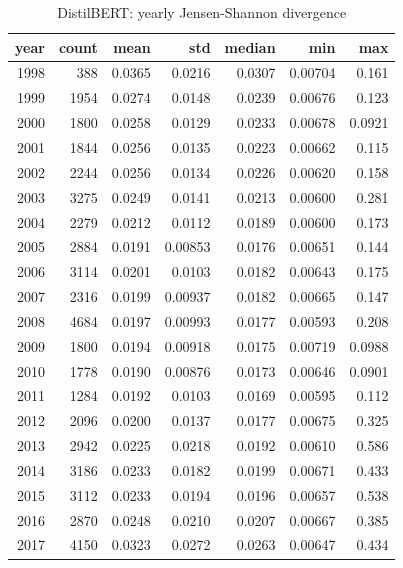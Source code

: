 \begin{table}[ht]
\centering
\caption{DistilBERT: yearly Jensen-Shannon divergence}
\label{tab:distilbert_jsd_all_years}
\begin{tabular}{rrrrrrr}
\toprule
year & count & mean & std & median & min & max \\
\midrule
1998 & 388 & 0.0365 & 0.0216 & 0.0307 & 0.00704 & 0.161 \\
1999 & 1954 & 0.0274 & 0.0148 & 0.0239 & 0.00676 & 0.123 \\
2000 & 1800 & 0.0258 & 0.0129 & 0.0233 & 0.00678 & 0.0921 \\
2001 & 1844 & 0.0256 & 0.0135 & 0.0223 & 0.00662 & 0.115 \\
2002 & 2244 & 0.0256 & 0.0134 & 0.0226 & 0.00620 & 0.158 \\
2003 & 3275 & 0.0249 & 0.0141 & 0.0213 & 0.00600 & 0.281 \\
2004 & 2279 & 0.0212 & 0.0112 & 0.0189 & 0.00600 & 0.173 \\
2005 & 2884 & 0.0191 & 0.00853 & 0.0176 & 0.00651 & 0.144 \\
2006 & 3114 & 0.0201 & 0.0103 & 0.0182 & 0.00643 & 0.175 \\
2007 & 2316 & 0.0199 & 0.00937 & 0.0182 & 0.00665 & 0.147 \\
2008 & 4684 & 0.0197 & 0.00993 & 0.0177 & 0.00593 & 0.208 \\
2009 & 1800 & 0.0194 & 0.00918 & 0.0175 & 0.00719 & 0.0988 \\
2010 & 1778 & 0.0190 & 0.00876 & 0.0173 & 0.00646 & 0.0901 \\
2011 & 1284 & 0.0192 & 0.0103 & 0.0169 & 0.00595 & 0.112 \\
2012 & 2096 & 0.0200 & 0.0137 & 0.0177 & 0.00675 & 0.325 \\
2013 & 2942 & 0.0225 & 0.0218 & 0.0192 & 0.00610 & 0.586 \\
2014 & 3186 & 0.0233 & 0.0182 & 0.0199 & 0.00671 & 0.433 \\
2015 & 3112 & 0.0233 & 0.0194 & 0.0196 & 0.00657 & 0.538 \\
2016 & 2870 & 0.0248 & 0.0210 & 0.0207 & 0.00667 & 0.385 \\
2017 & 4150 & 0.0323 & 0.0272 & 0.0263 & 0.00647 & 0.434 \\
\bottomrule
\end{tabular}
\end{table}
